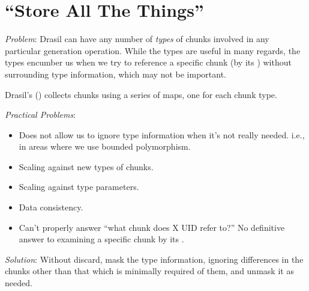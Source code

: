 \chapter{\textquotedblleft{}Store All The Things\textquotedblright{}}
\label{chap:storingChunks}

\begin{writingdirectives}

      \item \textit{Problem}: Drasil can have any number of \textit{types} of
            chunks involved in any particular generation operation. While the
            types are useful in many regards, the types encumber us when we try
            to reference a specific chunk (by its \UID{}) without surrounding
            type information, which may not be important.

      \item Drasil's \ChunkDB{} () collects chunks
            using a series of maps, one for each chunk type.

      \item \textit{Practical Problems}:
            \begin{itemize}

                  \item Does not allow us to ignore type information when it's
                        not really needed. i.e., in areas where we use bounded
                        polymorphism.

                  \item Scaling against new types of chunks.
                  
                  \item Scaling against type parameters.
                  
                  \item Data consistency.
                  
                  \item Can't properly answer ``what chunk does X UID refer
                        to?'' No definitive answer to examining a specific chunk
                        by its \UID{}.

            \end{itemize}

      \item \textit{Solution}: Without discard, mask the type information,
            ignoring differences in the chunks other than that which is
            minimally required of them, and unmask it as needed.


\end{writingdirectives}
